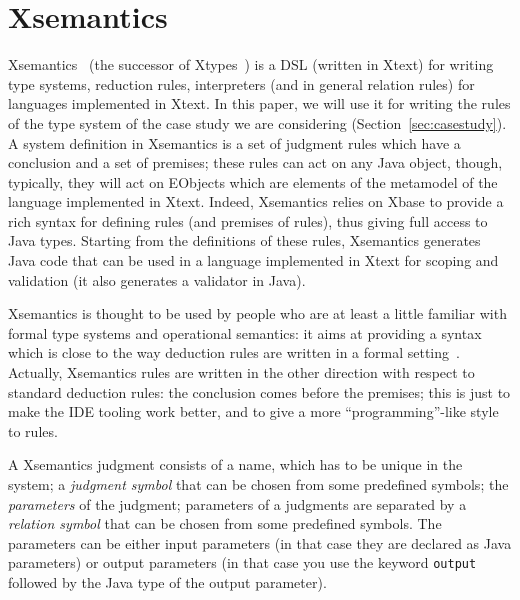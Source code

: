 \section{Xsemantics}
\label{sec:xsemantics}

Xsemantics~\cite{lbts} (the successor of Xtypes~\cite{Bet11}) is a DSL (written
in Xtext) for writing type systems, reduction rules, interpreters (and in
general relation rules) for languages implemented in Xtext.
In this paper, we will use it for writing the rules of the type system of the
case study we are considering (Section~\ref{sec:casestudy}).
A system definition in Xsemantics is a set of judgment rules which have a
conclusion and a set of premises; these rules can act on any Java object,
though, typically, they will act on EObjects which are elements of the metamodel
of the language implemented in Xtext.  Indeed, Xsemantics relies on Xbase to
provide a rich syntax for defining rules (and premises of rules), thus giving
full access to Java types.
Starting from the definitions of these rules, Xsemantics generates Java code
that can be used in a language implemented in Xtext for scoping and validation
(it also generates a validator in Java).

Xsemantics is thought to be used by people who are at least a little familiar
with formal type systems and operational semantics: it aims at providing
a syntax which is close to the way deduction rules are written in a formal
setting~\cite{hindley:1997a,Pierce02}.
Actually, Xsemantics rules are written in the other direction with respect
to standard deduction rules: the conclusion comes before the premises; this is
just to make the IDE tooling work better, and to give a more ``programming''-like
style to rules.



A Xsemantics judgment consists of a name, which has to be unique in the system;
a \textit{judgment symbol} that can be chosen from some predefined symbols; the
\textit{parameters} of the judgment; parameters of a judgments are separated by
a \textit{relation symbol} that can be chosen from some predefined symbols.
The parameters can be either input parameters (in that case they are declared as
Java parameters) or output parameters (in that case you use the keyword
\verb|output| followed by the Java type of the output parameter).

